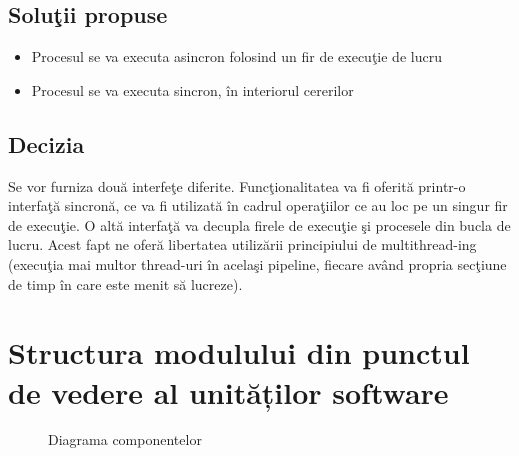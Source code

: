 	\subsection{Soluţii propuse}
	\begin{itemize}
	 \setlength\itemsep{0em}
		\item Procesul se va executa asincron folosind un fir de execuţie de lucru
		\item Procesul se va executa sincron, în interiorul cererilor
	\end{itemize}


	\subsection{Decizia}
	Se vor furniza două interfeţe diferite. Funcţionalitatea va fi oferită printr-o interfaţă sincronă, ce va fi utilizată în cadrul operaţiilor ce au loc pe un singur fir de execuţie. O altă interfaţă va decupla firele de execuţie şi procesele din bucla de lucru.
	Acest fapt ne oferă libertatea utilizării principiului de multithread-ing (execuţia mai multor thread-uri în acelaşi pipeline, fiecare având propria secţiune de timp în care este menit să lucreze).
\clearpage 

\section{Structura modulului din punctul de vedere al unităților software}
\begin{figure}[h!]
  \centering
  \caption{Diagrama componentelor}
  \end{figure}	
  
